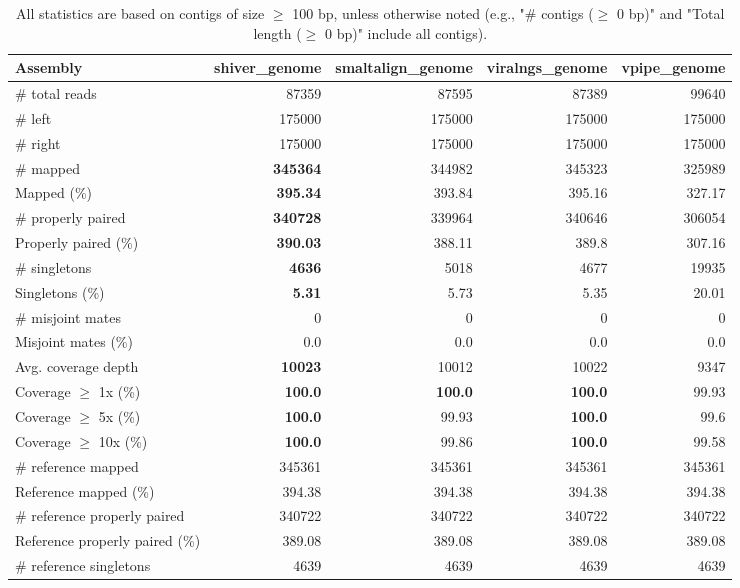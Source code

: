 \documentclass[12pt,a4paper]{article}
\begin{document}
\begin{table}[ht]
\begin{center}
\caption{All statistics are based on contigs of size $\geq$ 100 bp, unless otherwise noted (e.g., "\# contigs ($\geq$ 0 bp)" and "Total length ($\geq$ 0 bp)" include all contigs).}
\begin{tabular}{|l*{4}{|r}|}
\hline
Assembly & shiver\_genome & smaltalign\_genome & viralngs\_genome & vpipe\_genome \\ \hline
\# total reads & 87359 & 87595 & 87389 & 99640 \\ \hline
\# left & 175000 & 175000 & 175000 & 175000 \\ \hline
\# right & 175000 & 175000 & 175000 & 175000 \\ \hline
\# mapped & {\bf 345364} & 344982 & 345323 & 325989 \\ \hline
Mapped (\%) & {\bf 395.34} & 393.84 & 395.16 & 327.17 \\ \hline
\# properly paired & {\bf 340728} & 339964 & 340646 & 306054 \\ \hline
Properly paired (\%) & {\bf 390.03} & 388.11 & 389.8 & 307.16 \\ \hline
\# singletons & {\bf 4636} & 5018 & 4677 & 19935 \\ \hline
Singletons (\%) & {\bf 5.31} & 5.73 & 5.35 & 20.01 \\ \hline
\# misjoint mates & 0 & 0 & 0 & 0 \\ \hline
Misjoint mates (\%) & 0.0 & 0.0 & 0.0 & 0.0 \\ \hline
Avg. coverage depth & {\bf 10023} & 10012 & 10022 & 9347 \\ \hline
Coverage $\geq$ 1x (\%) & {\bf 100.0} & {\bf 100.0} & {\bf 100.0} & 99.93 \\ \hline
Coverage $\geq$ 5x (\%) & {\bf 100.0} & 99.93 & {\bf 100.0} & 99.6 \\ \hline
Coverage $\geq$ 10x (\%) & {\bf 100.0} & 99.86 & {\bf 100.0} & 99.58 \\ \hline
\# reference mapped & 345361 & 345361 & 345361 & 345361 \\ \hline
Reference mapped (\%) & 394.38 & 394.38 & 394.38 & 394.38 \\ \hline
\# reference properly paired & 340722 & 340722 & 340722 & 340722 \\ \hline
Reference properly paired (\%) & 389.08 & 389.08 & 389.08 & 389.08 \\ \hline
\# reference singletons & 4639 & 4639 & 4639 & 4639 \\ \hline

\end{tabular}
\end{center}
\end{table}
\end{document}
